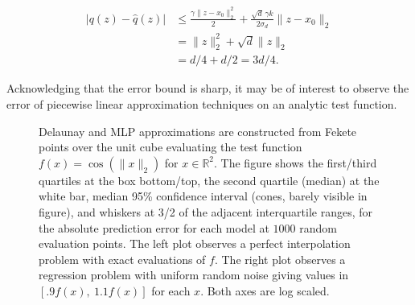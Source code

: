 \documentclass[smallextended,final]{svjour3}  %
\begin{document}
\vspace{-2mm}
\begin{align*}
  \big|q(z) - \hat q(z)\big|
  &\leq \frac{\gamma \|z - x_0\|_2^2}{2} + \frac{\sqrt{d}\,\gamma k}
      {2 \sigma_d} \|z - x_0\|_2 \\
  &{}=  \|z\|_2^2 + \sqrt{d} \|z\|_2 \\
  &{}=  d/4 + d/2 = 3d/4.
\end{align*}
\vspace{-2mm}

\noindent Acknowledging that the error bound is sharp, it may be of
interest to observe the error of piecewise linear approximation
techniques on an analytic test function.

\begin{figure}
  \centering
  \caption{Delaunay and MLP approximations are constructed from Fekete
    points over the unit cube evaluating the test function $f(x) =
    \cos(\|x\|_2)$ for $x \in \mathbb{R}^2$. The figure shows the
    first/third quartiles at the box bottom/top, the second quartile
    (median) at the white bar, median 95\% confidence interval (cones,
    barely visible in figure), and whiskers at 3/2 of the adjacent
    interquartile ranges, for the absolute prediction error for each
    model at $1000$ random evaluation points. The left plot observes a
    perfect interpolation problem with exact evaluations of $f.$ The
    right plot observes a regression problem with uniform random noise
    giving values in $[.9 f(x),\ 1.1f(x)]$ for each $x.$ Both axes are
    log scaled.}
  \label{fig:convergence-2d}
\end{figure}
\end{document}
